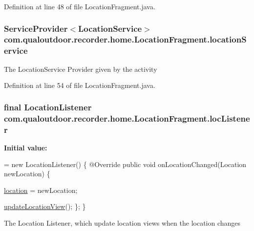 Definition at line 48 of file Location\-Fragment.\-java.

\hypertarget{classcom_1_1qualoutdoor_1_1recorder_1_1home_1_1LocationFragment_a1a86c1aef13ddcaec231b52af6afe9db}{
\subsubsection[{location\-Service}]{\setlength{\rightskip}{0pt plus 5cm}Service\-Provider$<${\bf Location\-Service}$>$ com.\-qualoutdoor.\-recorder.\-home.\-Location\-Fragment.\-location\-Service\hspace{0.3cm}{\ttfamily [private]}}}\label{classcom_1_1qualoutdoor_1_1recorder_1_1home_1_1LocationFragment_a1a86c1aef13ddcaec231b52af6afe9db}
The Location\-Service Provider given by the activity 

Definition at line 54 of file Location\-Fragment.\-java.

\hypertarget{classcom_1_1qualoutdoor_1_1recorder_1_1home_1_1LocationFragment_ab494bebfd465bfe1c6e816dd84e7c1b9}{
\subsubsection[{loc\-Listener}]{\setlength{\rightskip}{0pt plus 5cm}final Location\-Listener com.\-qualoutdoor.\-recorder.\-home.\-Location\-Fragment.\-loc\-Listener\hspace{0.3cm}{\ttfamily [private]}}}\label{classcom_1_1qualoutdoor_1_1recorder_1_1home_1_1LocationFragment_ab494bebfd465bfe1c6e816dd84e7c1b9}
{\bfseries Initial value\-:}
\begin{DoxyCode}
= \textcolor{keyword}{new} LocationListener() \{
        @Override
        \textcolor{keyword}{public} \textcolor{keywordtype}{void} onLocationChanged(Location newLocation) \{
            
            \hyperlink{classcom_1_1qualoutdoor_1_1recorder_1_1home_1_1LocationFragment_a3dd24810ca51567a5c911196638ead94}{location} = newLocation;
            
            \hyperlink{classcom_1_1qualoutdoor_1_1recorder_1_1home_1_1LocationFragment_a4fcaa88bffad9aaf7772832f7e9146da}{updateLocationView}();
        \};
    \}
\end{DoxyCode}
The Location Listener, which update location views when the location changes 

